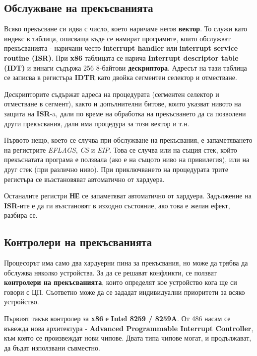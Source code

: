 \documentclass[fleqn,12pt]{article}
\begin{document}
\subsection{Обслужване на прекъсванията}
Всяко прекъсване си идва с число, което наричаме негов \textbf{вектор}. То служи като индекс в таблица, 
описваща къде се намират програмите, които обслужват прекъсванията - наричани често \textbf{interrupt handler}
или \textbf{interrupt service routine (ISR)}. При \textbf{x86} таблицата се нарича \textbf{Interrupt descriptor table (IDT)}
и винаги съдържа 256 8-байтови \textbf{дескриптора}. Адресът на тази таблица се записва в регистъра \textbf{IDTR} като двойка
сегментен селектор и отместване.

Дескрипторите съдържат адреса на процедурата (сегментен селектор и отместване в сегмент), както и допълнителни битове,
които указват нивото на защита на \textbf{ISR}-a, дали по време на обработка на прекъсването да са позволени други прекъсвания,
дали има процедура за този вектор и т.н.

Първото нещо, което се случва при обслужване на прекъсвания, е запаметяването на регистрите \textit{EFLAGS}, \textit{CS} и \textit{EIP}.
Това се случва или на същия стек, който прекъснатата програма е ползвала (ако е на същото ниво на привилегия), или на друг стек (при различно ниво).
При приключването на процедурата трите регистъра се възстановяват автоматично от хардуера.

Останалите регистри \textbf{НЕ} се запаметяват автоматично от хардуера. Задължение на \textbf{ISR}-ите е да ги възстановят в изходно състояние,
ако това е желан ефект, разбира се.  

\subsection{Контролери на прекъсванията}
Процесорът има само два хардуерни пина за прекъсвания, но може да трябва да обслужва няколко устройства.
За да се решават конфликти, се ползват \textbf{контролери на прекъсванията}, които определят кое 
устройство кога ще си говори с ЦП. Съответно може да се зададат индивидуални приоритети за всяко устройство.

Първият такъв контролер за \textbf{x86} е \textbf{Intel 8259 / 8259A}. От 486 насам се въвежда нова архитектура - 
\textbf{Advanced Programmable Interrupt Controller}, към която се произвеждат нови чипове. Двата типа чипове
могат, и продължават, да бъдат използвани съвместно.
\end{document}

